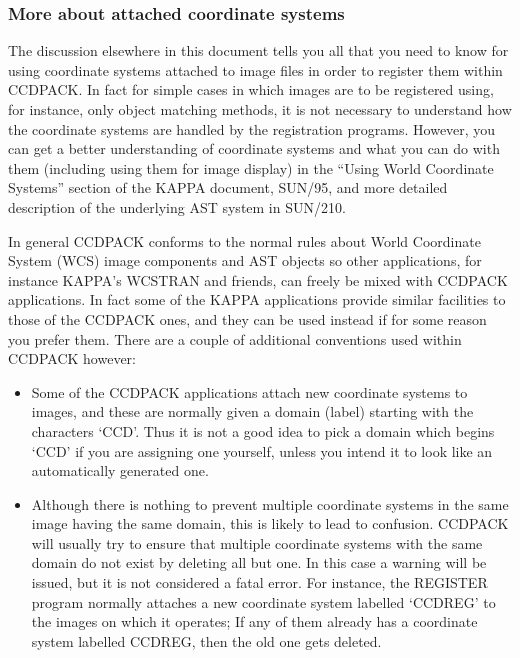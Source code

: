 \documentclass[twoside,11pt]{article}
\newcommand{\xref}[3]{#1}
\renewcommand{\_}{\texttt{\symbol{95}}}
\newcommand{\routine}[1]{{\sc #1}}
\begin{document}
\subsubsection{More about attached coordinate systems}

The discussion elsewhere in this document tells you all 
that you need to know
for using coordinate systems attached to image files
in order to register them within CCDPACK.
In fact for simple cases in which images are to be registered using,
for instance, only object matching methods, it is not necessary to
understand how the coordinate systems are handled by the registration
programs.
However, you can get a better understanding of coordinate systems
and what you can do with them (including using them for image display)
in the ``\xref{Using World Coordinate Systems}{sun95}{se_wcsuse}''
section of the KAPPA document, \xref{SUN/95}{sun95}{},
and more detailed description of the underlying AST system in 
\xref{SUN/210}{sun210}{}.

In general CCDPACK conforms to the normal rules about World Coordinate
System (WCS) image components and AST objects
so other applications, for instance
KAPPA's \xref{WCSTRAN}{sun95}{WCSTRAN} and friends, can freely
be mixed with CCDPACK applications.  In fact some of the KAPPA
applications provide similar facilities to those of the CCDPACK
ones, and they can be used instead if for some reason you prefer
them.
There are a couple of additional conventions used within CCDPACK however:
\begin{itemize}
\item
Some of the CCDPACK applications attach 
new coordinate systems to images,
and these are normally given a domain (label) 
starting with the characters `CCD\_'.
Thus it is not a good idea to pick a domain which begins `CCD\_'
if you are assigning one yourself, unless you intend it to look
like an automatically generated one.
\item
Although there is nothing to prevent multiple coordinate systems 
in the same image having the same domain, this is likely to lead
to confusion.  CCDPACK will usually try to ensure that multiple
coordinate systems with the same domain do not exist by deleting all but one.
In this case a warning will be issued, but it is not considered
a fatal error.
For instance, the \routine{REGISTER} program normally attaches a new
coordinate system labelled `CCD\_REG' to the images on which it operates;
If any of them already has a coordinate system labelled CCD\_REG,
then the old one gets deleted.
\end{itemize}
\end{document}
